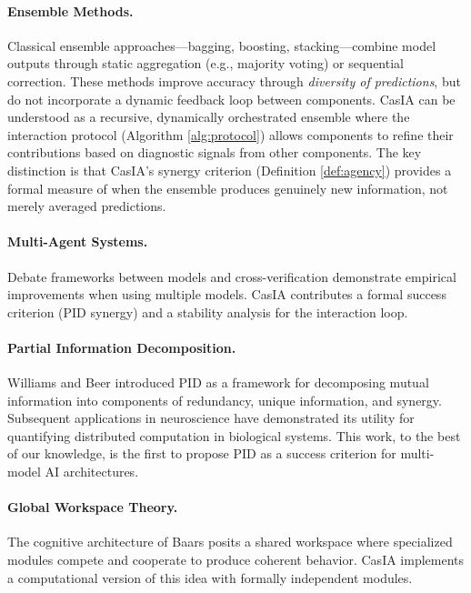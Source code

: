 \documentclass[11pt,a4paper]{article}
\theoremstyle{remark}
\begin{document}
\paragraph{Ensemble Methods.}
Classical ensemble approaches---bagging, boosting, stacking---combine model outputs through static aggregation (e.g., majority voting) or sequential correction. These methods improve accuracy through \emph{diversity of predictions}, but do not incorporate a dynamic feedback loop between components. CasIA can be understood as a recursive, dynamically orchestrated ensemble where the interaction protocol (Algorithm \ref{alg:protocol}) allows components to refine their contributions based on diagnostic signals from other components. The key distinction is that CasIA's synergy criterion (Definition \ref{def:agency}) provides a formal measure of when the ensemble produces genuinely new information, not merely averaged predictions.

\paragraph{Multi-Agent Systems.}
Debate frameworks between models \cite{irving2018debate,du2023multiagent} and cross-verification \cite{cohen2023lmvsverifier} demonstrate empirical improvements when using multiple models. CasIA contributes a formal success criterion (PID synergy) and a stability analysis for the interaction loop.

\paragraph{Partial Information Decomposition.}
Williams and Beer \cite{williams2010pid} introduced PID as a framework for decomposing mutual information into components of redundancy, unique information, and synergy. Subsequent applications in neuroscience \cite{timme2018pid_neuro} have demonstrated its utility for quantifying distributed computation in biological systems. This work, to the best of our knowledge, is the first to propose PID as a success criterion for multi-model AI architectures.

\paragraph{Global Workspace Theory.}
The cognitive architecture of Baars \cite{baars1988cognitive} posits a shared workspace where specialized modules compete and cooperate to produce coherent behavior. CasIA implements a computational version of this idea with formally independent modules.
\end{document}
